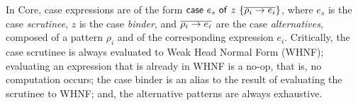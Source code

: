 \documentclass[acmsmall,review]{acmart}
\newcommand{\parawith}[1]{\paragraph{\emph{#1}}}
\newcommand{\ccase}[2]{\mathsf{case}~#1~\mathsf{of}~#2}
\begin{document}

In Core, case expressions are of the form $\ccase{e_s}{z~\{\ov{\rho_i \to e_i}\}}$,
where $e_s$ is the case \emph{scrutinee}, $z$ is the case \emph{binder}, and
$\overline{\rho_i \to e_i}$ are the case \emph{alternatives}, composed of a pattern
$\rho_i$ and of the corresponding expression $e_i$. Critically,
the case scrutinee is always evaluated to Weak Head Normal Form (WHNF);
%
evaluating an expression that is already in WHNF is a no-op, that is,
no computation occurs; 
%
the case binder is an alias to the result of evaluating the scrutinee
to WHNF; and,
the alternative patterns are always exhaustive.


\end{document}
